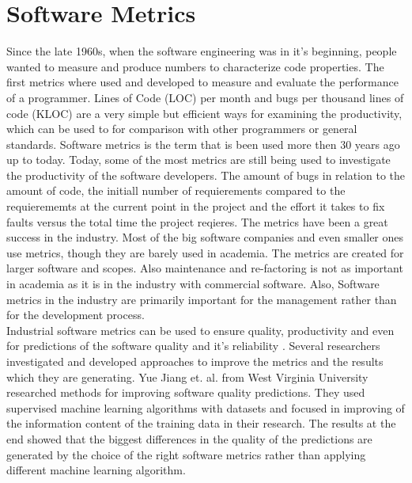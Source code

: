\section{Software Metrics}
Since the late 1960s, when the software engineering was in it's beginning, people wanted to measure and produce numbers to characterize code properties. 
The first metrics where used and developed to measure and evaluate the performance of a programmer. Lines of Code (LOC) per month and bugs per thousand lines of code (KLOC) are a very simple but efficient ways for examining the productivity, which can be used to for comparison with other programmers or general standards.
\bigbreak
Software metrics is the term that is been used more then 30 years ago up to today.
Today, some of the most metrics are still being used to investigate the productivity of the software developers. The amount of bugs in relation to the amount of code, the initiall number of requierements compared to the requierememts at the current point in the project and the effort it takes to fix faults versus the total time the project reqieres. \cite{kaner2004software}
The metrics have been a great success in the industry. Most of the big software companies and even smaller ones use metrics, though they are barely used in academia. 
The metrics are created for larger software and scopes. Also maintenance and re-factoring is not as important in academia as it is in the industry with commercial software. Also, Software metrics in the industry are primarily important for the management rather than for the development process.\\
Industrial software metrics can be used to ensure quality, productivity and even for predictions of the software quality and it's reliability \cite{fenton1999software}.
Several researchers investigated and developed approaches to improve the metrics and the results which they are generating. 
Yue Jiang et. al. \cite{jiang2008comparing} from West Virginia University researched methods for improving software quality predictions. They used supervised machine learning algorithms with datasets and focused in improving of the information content of the training data in their research. The results at the end showed that the biggest differences in the quality of the predictions are generated by the choice of the right software metrics rather than applying different machine learning algorithm. 

